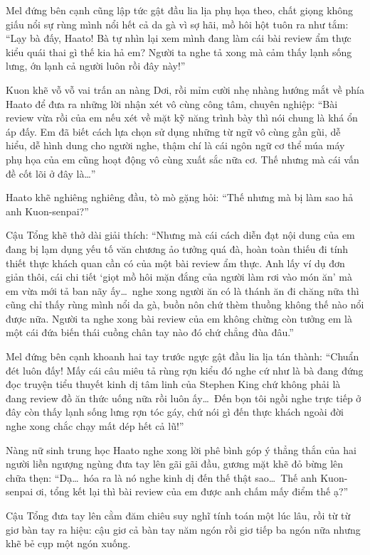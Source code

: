 \documentclass[../main.tex]{subfiles}
\begin{document}
Mel đứng bên cạnh cũng lập tức gật đầu lia lịa phụ họa theo, chất giọng không giấu nổi sự rùng mình nổi hết cả da gà vì sợ hãi, mồ hôi hột tuôn ra như tắm: ``Lạy bà đấy, Haato! Bà tự nhìn lại xem mình đang làm cái bài review ẩm thực kiểu quái thai gì thế kia hả em? Người ta nghe tả xong mà cảm thấy lạnh sống lưng, ớn lạnh cả người luôn rồi đây này!''

Kuon khẽ vỗ vỗ vai trấn an nàng Dơi, rồi mỉm cười nhẹ nhàng hướng mắt về phía Haato để đưa ra những lời nhận xét vô cùng công tâm, chuyên nghiệp: ``Bài review vừa rồi của em nếu xét về mặt kỹ năng trình bày thì nói chung là khá ổn áp đấy. Em đã biết cách lựa chọn sử dụng những từ ngữ vô cùng gần gũi, dễ hiểu, dễ hình dung cho người nghe, thậm chí là cái ngôn ngữ cơ thể múa máy phụ họa của em cũng hoạt động vô cùng xuất sắc nữa cơ. Thế nhưng mà cái vấn đề cốt lõi ở đây là\dots''

Haato khẽ nghiêng nghiêng đầu, tò mò gặng hỏi: ``Thế nhưng mà bị làm sao hả anh Kuon-senpai?''

Cậu Tổng khẽ thở dài giải thích: ``Nhưng mà cái cách diễn đạt nội dung của em đang bị lạm dụng yếu tố văn chương ảo tưởng quá đà, hoàn toàn thiếu đi tính thiết thực khách quan cần có của một bài review ẩm thực. Anh lấy ví dụ đơn giản thôi, cái chi tiết `giọt mồ hôi mặn đắng của người làm rơi vào món ăn' mà em vừa mới tả ban nãy ấy\dots\ nghe xong người ăn có là thánh ăn đi chăng nữa thì cũng chỉ thấy rùng mình nổi da gà, buồn nôn chứ thèm thuồng không thế nào nổi được nữa. Người ta nghe xong bài review của em không chừng còn tưởng em là một cái đứa biến thái cuồng chân tay nào đó chứ chẳng đùa đâu.''

Mel đứng bên cạnh khoanh hai tay trước ngực gật đầu lia lịa tán thành: ``Chuẩn đét luôn đấy! Mấy cái câu miêu tả rùng rợn kiểu đó nghe cứ như là bà đang đứng đọc truyện tiểu thuyết kinh dị tâm linh của Stephen King chứ không phải là đang review đồ ăn thức uống nữa rồi luôn ấy\dots\ Đến bọn tôi ngồi nghe trực tiếp ở đây còn thấy lạnh sống lưng rợn tóc gáy, chứ nói gì đến thực khách ngoài đời nghe xong chắc chạy mất dép hết cả lũ!''

Nàng nữ sinh trung học Haato nghe xong lời phê bình góp ý thẳng thắn của hai người liền ngượng ngùng đưa tay lên gãi gãi đầu, gương mặt khẽ đỏ bừng lên chữa thẹn: ``Dạ\dots\ hóa ra là nó nghe kinh dị đến thế thật sao\dots\ Thế anh Kuon-senpai ơi, tổng kết lại thì bài review của em được anh chấm mấy điểm thế ạ?''

Cậu Tổng đưa tay lên cằm đăm chiêu suy nghĩ tính toán một lúc lâu, rồi từ từ giơ bàn tay ra hiệu: cậu giơ cả bàn tay năm ngón rồi giơ tiếp ba ngón nữa nhưng khẽ bẻ cụp một ngón xuống.
\end{document}
